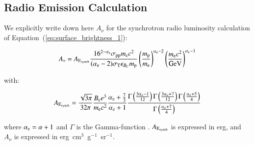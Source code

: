 \documentclass[traditabstract]{aa}
\newcommand{\rmn}{\mathrm}
\begin{document}
\begin{appendix}
\section{Radio Emission Calculation}
\label{app:A}

We explicitly write down here $A_{\nu}$ for the synchrotron radio luminosity calculation of Equation~(\ref{eq:surface_brightness_1}):

\begin{equation}
A_{\nu} = A_{\rm{E_{synch}}} \frac{16^{2-\alpha_{\rm{e}}}\sigma_{\rm{pp}}m_{\rm{e}}c^{2}}{(\alpha_{\rm{e}}-2)\sigma_{\rm{T}}\epsilon_{B_{\rm{C}}}m_{\rm{p}}}\left(\frac{m_{\rm{p}}
}{m_{\rm{e}}}\right)^{\alpha_{\rm{e}}-2} \left(\frac{m_{\rm{e}}c^{2}}{\rmn{GeV}}\right)^{\alpha_{\rm{e}}-1}
\end{equation}

with:

\begin{equation}
A_{\rm{E_{synch}}} = \frac{\sqrt{3\pi}}{32\pi}\frac{B_{\rm{c}}e^{3}}{m_{\rm{e}}c^{2}}\frac{\alpha_{\rm{e}}+\frac{7}{3}}{\alpha_{\rm{e}}+1}\frac{\Gamma\left(\frac{3\alpha_{\rm{e}}-1}{12}\right)\Gamma\left(\frac{3\alpha_{\rm{e}}+7}{12}\right)\Gamma\left(\frac{\alpha_{\rm{e}}+5}{4}\right)}{\Gamma\left(\frac{\alpha_{\rm{e}}+7}{4}\right)}
\end{equation}

where $\alpha_{\rm{e}}=\alpha+1$ and $\Gamma$ is the Gamma-function \citep{1965hmfw.book.....A}. $A_{\rm{E_{synch}}}$ is expressed in erg, and $A_{\nu}$ is expressed in erg~cm$^{3}$~g$^{-1}$~sr$^{-1}$. 


\end{appendix}
\end{document}
